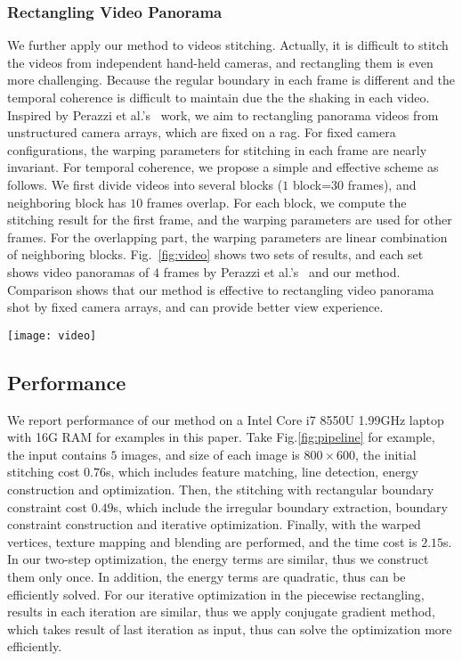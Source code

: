 \documentclass[10pt,journal,compsoc]{IEEEtran}
\begin{document}
\subsubsection{Rectangling Video Panorama}

We further apply our method to videos stitching.
Actually, it is difficult to stitch the videos from independent hand-held cameras, and rectangling them is even more challenging.
Because the regular boundary in each frame is different and the temporal coherence is difficult to maintain due the the shaking in each video.
Inspired by Perazzi et al.'s~\cite{journals/cgf/PerazziSZKWWG15} work, we aim to rectangling panorama videos from unstructured camera arrays, which are fixed on a rag.
For fixed camera configurations,  the warping parameters for stitching in each frame are nearly invariant.
For temporal coherence, we propose a simple and effective scheme as follows.
We first divide videos into several blocks ($1$ block=$30$ frames), and neighboring block has $10$ frames overlap.
For each block, we compute the stitching result for the first frame, and the warping parameters are used for other frames.
For the overlapping part, the warping parameters are linear combination of neighboring blocks.
Fig.~\ref{fig:video} shows two sets of results, and each set shows video panoramas of $4$ frames by Perazzi et al.'s~\cite{journals/cgf/PerazziSZKWWG15} and our method.
Comparison shows that our method is effective to rectangling video panorama shot by fixed camera arrays, and can provide better view experience.

 \begin{figure*} %
  \centering
  \texttt{[image: video]}
  \caption{Application of rectangling video panorama. We give two examples, and each example shows stitching results of $4$ different frames using Perazzi et al.'s~\cite{journals/cgf/PerazziSZKWWG15} method and our rectangling respectively.} \label{fig:video}
\end{figure*}

 \subsection{Performance}
We report performance of our method on a Intel Core i7 8550U 1.99GHz laptop with 16G RAM for examples in this paper. 
Take Fig.\ref{fig:pipeline} for example, the input contains $5$ images, and size of each image is $800\times600$, the initial stitching cost $0.76$s, which includes feature matching, line detection, energy construction and optimization.
Then, the stitching with rectangular boundary constraint cost $0.49$s, which include the irregular boundary extraction, boundary constraint construction and iterative optimization. Finally, with the warped vertices, texture mapping and blending are performed, and the time cost is $2.15$s.
In our two-step optimization, the energy terms are similar, thus we construct them only once. In addition, the energy terms are quadratic, thus can be efficiently solved.
For our iterative optimization in the piecewise rectangling, results in each iteration are similar, thus we apply conjugate gradient method, which takes result of last iteration as input, thus can solve the optimization more efficiently.
\end{document}
